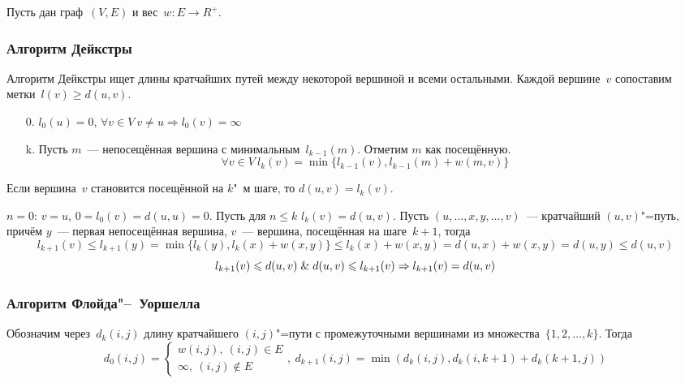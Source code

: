Пусть дан граф~$(V, E)$ и вес~$w \colon E \to R^+$.

\subsubsection{Алгоритм Дейкстры}
 Алгоритм Дейкстры ищет длины кратчайших путей между некоторой вершиной и всеми остальными.
Каждой вершине~$v$ сопоставим метки~$l(v) \geqslant d(u, v)$.
\begin{enumerate}
	\item[0.] $l_0(u) = 0$, $\forall v \in V \ v \neq u \Rightarrow l_0(v) = \infty$
	\item[k.] Пусть $m$~--- непосещённая вершина с минимальным~$l_{k-1}(m)$.
	Отметим $m$ как посещённую.
	\begin{equation*}
	\forall v \in V \ l_k(v) = \min \{ l_{k-1}(v), l_{k-1}(m) + w(m, v) \}
	\end{equation*}
\end{enumerate}

\begin{theorem}
Если вершина~$v$ становится посещённой на $k$"~м шаге, то $d(u, v) = l_k(v)$.
\end{theorem}
\begin{proofmathind}
	\indbase $n = 0$: $v = u$, $0 = l_0(v) = d(u, u) = 0$.
	\indstep Пусть для $n \leqslant k$ $l_k(v) = d(u, v)$.
	Пусть $(u, \ldots, x, y, \ldots, v)$~--- кратчайший $(u, v)$"=путь, причём $y$~--- первая непосещённая вершина, $v$~--- вершина, посещённая на шаге~$k + 1$, тогда
	\begin{equation*}
	l_{k+1}(v) \leqslant l_{k+1}(y) = \min \{ l_k(y), l_k(x) + w(x, y) \} \leqslant l_k(x) + w(x, y) = d(u, x) + w(x, y) = d(u, y) \leqslant d(u, v)
	\end{equation*}
	\begin{equation*}
	l_{k+1}(v) \leqslant d(u, v) \mathrel{\&} d(u, v) \leqslant l_{k+1}(v) \Rightarrow l_{k+1}(v) = d(u, v)
	\end{equation*}
	\indend
\end{proofmathind}

\subsubsection{Алгоритм Флойда"--~Уоршелла}
Обозначим через~$d_k(i, j)$ длину кратчайшего $(i, j)$"=пути с промежуточными вершинами из множества~$\{ 1, 2, \ldots, k \}$.
Тогда
\begin{equation*}
d_0(i, j) =
\begin{cases}
w(i, j), \ (i, j) \in E \\
\infty, \ (i, j) \notin E
\end{cases}, \
d_{k+1}(i, j) = \min(d_k(i, j), d_k(i, k + 1) + d_k(k + 1, j))
\end{equation*}